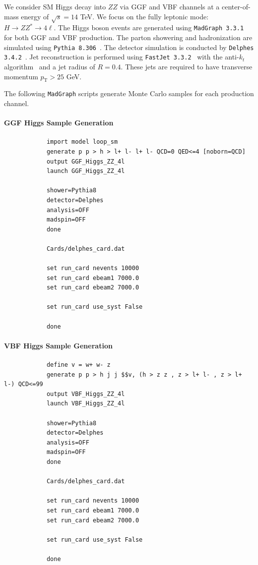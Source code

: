 \documentclass[12pt]{article}
\begin{document}
        We consider SM Higgs decay into $ZZ$ via GGF and VBF channels at a center-of-mass energy of $\sqrt{s} = 14$ TeV. We focus on the fully leptonic mode: $H \to ZZ^* \to 4\ell$. The Higgs boson events are generated using \verb|MadGraph 3.3.1|~\cite{Alwall:2014hca} for both GGF and VBF production. The parton showering and hadronization are simulated using \verb|Pythia 8.306|~\cite{Sjostrand:2014zea}. The detector simulation is conducted by \verb|Delphes 3.4.2|~\cite{deFavereau:2013fsa}. Jet reconstruction is performed using \verb|FastJet 3.3.2|~\cite{Cacciari:2011ma} with the anti-$k_t$ algorithm~\cite{Cacciari:2008gp} and a jet radius of $R = 0.4$. These jets are required to have transverse momentum $p_{\text{T}} > 25$ GeV.

        The following \verb|MadGraph| scripts generate Monte Carlo samples for each production channel.
        \paragraph{GGF Higgs Sample Generation}
        \begin{lstlisting}
            import model loop_sm
            generate p p > h > l+ l- l+ l- QCD=0 QED<=4 [noborn=QCD]
            output GGF_Higgs_ZZ_4l
            launch GGF_Higgs_ZZ_4l

            shower=Pythia8
            detector=Delphes
            analysis=OFF
            madspin=OFF
            done

            Cards/delphes_card.dat

            set run_card nevents 10000
            set run_card ebeam1 7000.0
            set run_card ebeam2 7000.0

            set run_card use_syst False

            done
        \end{lstlisting}
        \paragraph{VBF Higgs Sample Generation}
        \begin{lstlisting}
            define v = w+ w- z
            generate p p > h j j $$v, (h > z z , z > l+ l- , z > l+ l-) QCD<=99
            output VBF_Higgs_ZZ_4l
            launch VBF_Higgs_ZZ_4l

            shower=Pythia8
            detector=Delphes
            analysis=OFF
            madspin=OFF
            done

            Cards/delphes_card.dat

            set run_card nevents 10000
            set run_card ebeam1 7000.0
            set run_card ebeam2 7000.0

            set run_card use_syst False

            done
        \end{lstlisting}
\end{document}
